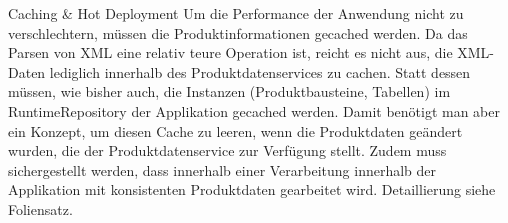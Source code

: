 Caching & Hot Deployment
Um die Performance der Anwendung nicht zu verschlechtern, müssen die Produktinformationen gecached werden. Da das Parsen von XML eine relativ teure Operation ist, reicht es nicht aus, die XML-Daten lediglich innerhalb des Produktdatenservices zu cachen. Statt dessen müssen, wie bisher auch, die Instanzen (Produktbausteine, Tabellen) im RuntimeRepository der Applikation gecached werden. Damit benötigt man aber ein Konzept, um diesen Cache zu leeren, wenn die Produktdaten geändert wurden, die der Produktdatenservice zur Verfügung stellt. Zudem muss sichergestellt werden, dass innerhalb einer Verarbeitung innerhalb der Applikation mit konsistenten Produktdaten gearbeitet wird. 
Detaillierung siehe Foliensatz.
